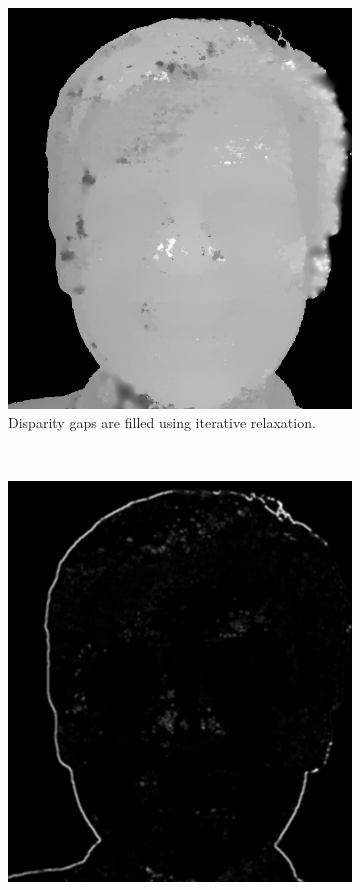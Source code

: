 \documentclass[journal]{IEEEtran}
\begin{document}
\begin{figure}[h]
    ~
    \begin{subfigure}[t]{0.45\linewidth}
        \centering
        \includegraphics[width=\linewidth]{Pics/disparity-fill.png}
        \caption{Disparity gaps are filled using iterative relaxation.}
        \label{fig:disparity-fill}
    \end{subfigure}
    ~
    \begin{subfigure}[t]{0.45\linewidth}
        \centering
        \includegraphics[width=\linewidth]{Pics/disparity-lapf.png}

\end{subfigure}
\end{figure}
\end{document}
